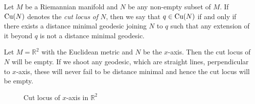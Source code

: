 \begin{defn}\label{cutlocus1}
    Let $M$ be a Riemannian manifold and $N$ be any non-empty subset of $M.$ If $\mathrm{Cu}(N)$ denotes the \emph{cut locus of $N$}, then we say that $q\in \mathrm{Cu}(N) $ if and only if there exists a distance minimal geodesic joining $N$ to $q$ such that any extension of it beyond $q$ is not a distance minimal geodesic.
\end{defn}
\bigskip
\begin{eg}\label{eg:Example-cutLocusOfx-Axis}
    Let $M=\mathbb{R}^2$ with the Euclidean metric and $N$ be the $x$-axis. Then the cut locus of $N$ will be empty. If we shoot any geodesic, which are straight lines, perpendicular to $x$-axis, these will never fail to be distance minimal and hence the cut locus will be empty.
    \begin{figure}[!htb]
        \centering
        \caption{Cut locus of $x$-axis in $\mathbb{R}^2$ }
    \end{figure}
\end{eg}
\vspace{0.3cm}


